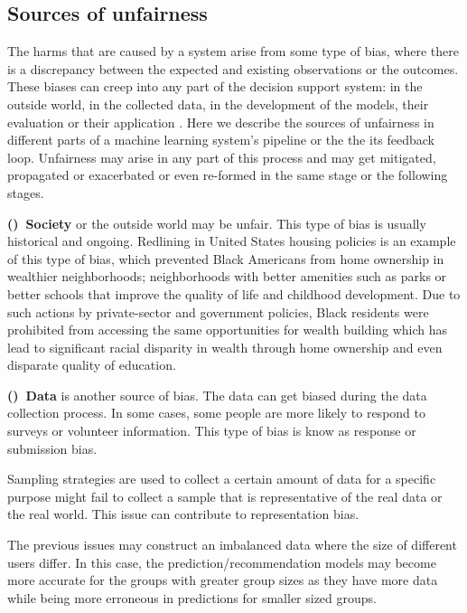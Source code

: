     \subsection{Sources of unfairness}
        The harms that are caused by a system arise from some type of bias, where there is a discrepancy between the expected and existing observations or the outcomes. These biases can creep into any part of the decision support system: in the outside world, in the collected data, in the development of the models, their evaluation or their application \cite{sureshframework2019}. Here we describe the sources of unfairness in different parts of a machine learning system's pipeline or the the its feedback loop. Unfairness may arise in any part of this process and may get mitigated, propagated or exacerbated or even re-formed in the same stage or the following stages.
        
        
        \textbf{()~Society} or the outside world may be unfair. This type of bias is usually historical and ongoing. Redlining in United States housing policies \cite{rothstein2017color} is an example of this type of bias, which prevented Black Americans from home ownership in wealthier neighborhoods; neighborhoods with better amenities such as parks or better schools that improve the quality of life and childhood development. Due to such actions by private-sector and government policies, Black residents were prohibited from accessing the same opportunities for wealth building which has lead to significant racial disparity in wealth through home ownership and even disparate quality of education.
        
        \textbf{()~Data} is another source of bias. The data can get biased during the data collection process. In some cases, some people are more likely to respond to surveys or volunteer information. This type of bias is know as response or submission bias. 
        
        Sampling strategies are used to collect a certain amount of data for a specific purpose might fail to collect a sample that is representative of the real data or the real world. This issue can contribute to representation bias.
        
        The previous issues may construct an imbalanced data where the size of different users differ. In this case, the prediction/recommendation models may become more accurate for the groups with greater group sizes as they have more data while being more erroneous in predictions for smaller sized groups.
        
